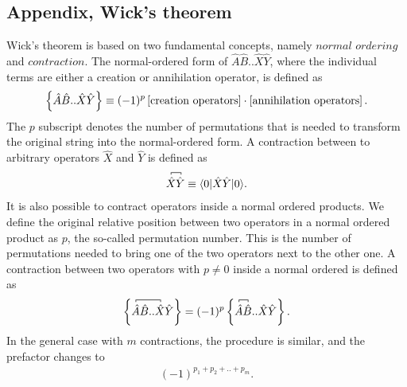\begin{prob}
  \section*{Appendix, Wick's theorem}
   Wick's theorem is based on
  two fundamental concepts, namely $\textit{normal ordering}$ and
  $\textit{contraction}$. The normal-ordered form of
  $\hat{A}\hat{B}..\hat{X}\hat{Y}$, where the individual terms are
  either a creation or annihilation operator, is defined as
  \begin{align}
  \label{def: Normal ordering}
  \kpr{\hat{A}\hat{B}..\hat{X}\hat{Y}} \equiv
  (-1)^p\fpr{\text{creation operators}}\cdot\fpr{\text{annihilation
      operators}}.
  \end{align}
  The $p$ subscript denotes the number of permutations that is needed
  to transform the original string into the normal-ordered form. A
  contraction between to arbitrary operators $\hat{X}$ and $\hat{Y}$
  is defined as
  \begin{align}
  \contraction[0.5ex]{}{\hat{X}}{}{\hat{Y}}{} \hat{X}\hat{Y} \equiv
  \for{0}{\hat{X}\hat{Y}}{0}.
  \end{align}
  It is also possible to contract operators inside a normal ordered
  products. We define the original relative position between two
  operators in a normal ordered product as $p$, the so-called
  permutation number. This is the number of permutations needed to
  bring one of the two operators next to the other one. A contraction
  between two operators with $p \neq 0$ inside a normal ordered is
  defined as
  \begin{align}
  \kpr{\contraction[0.5ex]{}{\hat{A}}{\hat{B}..}{\hat{X}}\hat{A}\hat{B}..\hat{X}\hat{Y}}
  = (-1)^p
  \kpr{\contraction[0.5ex]{}{\hat{A}}{}{\hat{B}}\hat{A}\hat{B}..\hat{X}\hat{Y}}.
  \end{align}
  In the general case with $m$ contractions, the procedure is similar,
  and the prefactor changes to
  \begin{align}
  (-1)^{p_1 + p_2 + .. + p_m}.
  \end{align} 


\end{prob}
